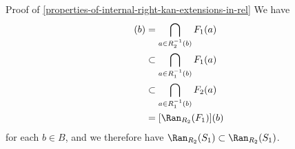 \begin{Proof}{Proof of \cref{properties-of-internal-right-kan-extensions-in-rel}}%
    We have
    \begin{align*}
        [\Ran_{R_{2}}(F_{1})](b) &=       \bigcap_{a\in R^{-1}_{2}(b)}F_{1}(a)\\
                                 &\subset \bigcap_{a\in R^{-1}_{1}(b)}F_{1}(a)\\
                                 &\subset \bigcap_{a\in R^{-1}_{1}(b)}F_{2}(a)\\
                                 &=       [\Ran_{R_{2}}(F_{1})](b)
    \end{align*}
    for each $b\in B$, and we therefore have $\Ran_{R_{2}}(S_{1})\subset\Ran_{R_{2}}(S_{1})$.


\end{Proof}
